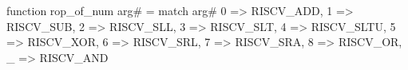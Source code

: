 function rop_of_num arg# = match arg# {
  0 => RISCV_ADD,
  1 => RISCV_SUB,
  2 => RISCV_SLL,
  3 => RISCV_SLT,
  4 => RISCV_SLTU,
  5 => RISCV_XOR,
  6 => RISCV_SRL,
  7 => RISCV_SRA,
  8 => RISCV_OR,
  _ => RISCV_AND
}
